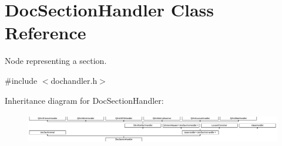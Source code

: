 \hypertarget{class_doc_section_handler}{}\section{Doc\+Section\+Handler Class Reference}
\label{class_doc_section_handler}


Node representing a section.  




{\ttfamily \#include $<$dochandler.\+h$>$}

Inheritance diagram for Doc\+Section\+Handler\+:\begin{figure}[H]
\begin{center}
\leavevmode
\includegraphics[height=1.322314cm]{class_doc_section_handler}
\end{center}
\end{figure}
